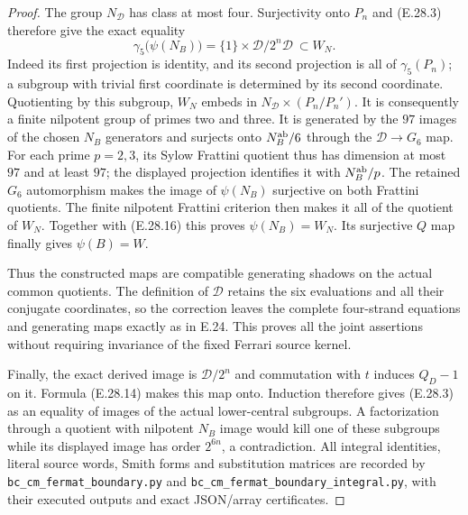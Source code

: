 \begin{proof}
The group $N_{\mathscr D}$ has class at most four.
Surjectivity onto $P_n$ and (E.28.3) therefore give the
exact equality
\[
 \gamma_5\bigl(\psi(N_B)\bigr)
           =\{1\}\times\mathcal D/2^n\mathcal D
           \ \subset W_N.
 \tag{E.28.16}
\]
Indeed its first projection is identity, and its second
projection is all of $\gamma_5(P_n)$; a subgroup with
trivial first coordinate is determined by its second
coordinate.  Quotienting by this subgroup, $W_N$
embeds in
$N_{\mathscr D}\times(P_n/P_n')$.
It is consequently a finite nilpotent group of primes
two and three.  It is generated by the $97$ images of
the chosen $N_B$ generators and surjects onto
$N_B^{\rm ab}/6$ through the $\mathscr D\to G_6$ map.
For each prime $p=2,3$, its Sylow Frattini quotient
thus has dimension at most $97$ and at least $97$;
the displayed projection identifies it with
$N_B^{\rm ab}/p$.  The retained $G_6$ automorphism makes
the image of $\psi(N_B)$ surjective on both Frattini
quotients.  The finite nilpotent Frattini criterion
then makes it all of the quotient of $W_N$.
Together with (E.28.16) this proves
$\psi(N_B)=W_N$.  Its surjective $Q$ map finally gives
$\psi(B)=W$.

Thus the constructed maps are compatible generating
shadows on the actual common quotients.  The definition
of $\mathscr D$ retains the six evaluations and all their
conjugate coordinates, so the correction leaves the
complete four-strand equations and generating maps
exactly as in E.24.  This proves all the joint assertions
without requiring invariance of the fixed Ferrari
source kernel.

Finally, the exact derived image is
$\mathcal D/2^n$ and commutation with $t$ induces
$Q_D-1$ on it.  Formula (E.28.14) makes this map onto.
Induction therefore gives (E.28.3) as an equality of
images of the actual lower-central subgroups.
A factorization through a quotient with nilpotent
$N_B$ image would kill one of these subgroups while
its displayed image has order $2^{6n}$, a contradiction.
All integral identities, literal source words, Smith
forms and substitution matrices are recorded by
\texttt{bc\_cm\_fermat\_boundary.py} and
\texttt{bc\_cm\_fermat\_boundary\_integral.py}, with their
executed outputs and exact JSON/array certificates.
\end{proof}
